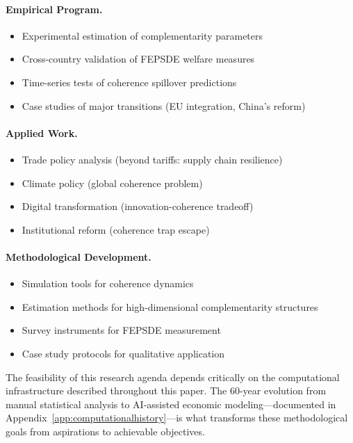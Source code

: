 \documentclass[12pt,a4paper]{article}
\begin{document}
\paragraph{Empirical Program.}
\begin{itemize}
  \item Experimental estimation of complementarity parameters
  \item Cross-country validation of FEPSDE welfare measures
  \item Time-series tests of coherence spillover predictions
  \item Case studies of major transitions (EU integration, China's reform)
\end{itemize}

\paragraph{Applied Work.}
\begin{itemize}
  \item Trade policy analysis (beyond tariffs: supply chain resilience)
  \item Climate policy (global coherence problem)
  \item Digital transformation (innovation-coherence tradeoff)
  \item Institutional reform (coherence trap escape)
\end{itemize}

\paragraph{Methodological Development.}
\begin{itemize}
  \item Simulation tools for coherence dynamics
  \item Estimation methods for high-dimensional complementarity structures
  \item Survey instruments for FEPSDE measurement
  \item Case study protocols for qualitative application
\end{itemize}

The feasibility of this research agenda depends critically on
the computational infrastructure described throughout this paper.
The 60-year evolution from manual statistical analysis to AI-assisted
economic modeling---documented in Appendix~\ref{app:computationalhistory}---is
what transforms these methodological goals from aspirations to achievable objectives.
\end{document}
